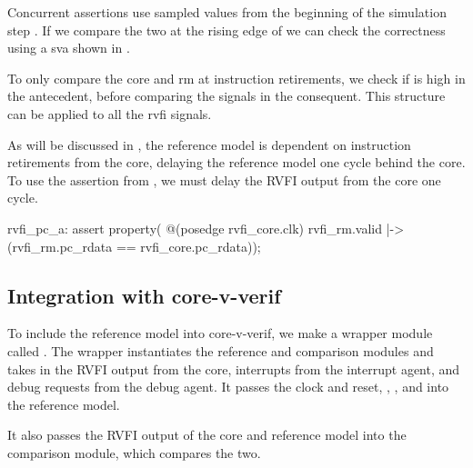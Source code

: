 
Concurrent assertions use sampled values from the beginning of the simulation step \cite{cernySVAPowerAssertions2015}. 
If we compare the two at the rising edge of  we can check the correctness using a \acrshort{sva} shown in . 

To only compare the core and \acrshort{rm} at instruction retirements, we check if  is high in the antecedent, before comparing the  signals in the consequent. This structure can be applied to all the \acrshort{rvfi} signals.

As will be discussed in , the reference model is dependent on instruction retirements from the core, delaying the reference model one cycle behind the core. To use the assertion from , we must delay the RVFI output from the core one cycle.

\begin{systemverilog}[caption={Assertion comparing the PC of the \acrshort{rm} and core.}, label={lst:pc_assertion}]
rvfi_pc_a: assert property( @(posedge rvfi_core.clk)
    rvfi_rm.valid |-> (rvfi_rm.pc_rdata == rvfi_core.pc_rdata));
\end{systemverilog}




\subsection{Integration with core-v-verif}

To include the reference model into core-v-verif, we make a wrapper module called . The wrapper instantiates the reference and comparison modules and takes in the RVFI output from the core, interrupts from the interrupt agent, and debug requests from the debug agent. It passes the clock and reset, , , and  into the reference model.

It also passes the RVFI output of the core and reference model into the comparison module, which compares the two.



